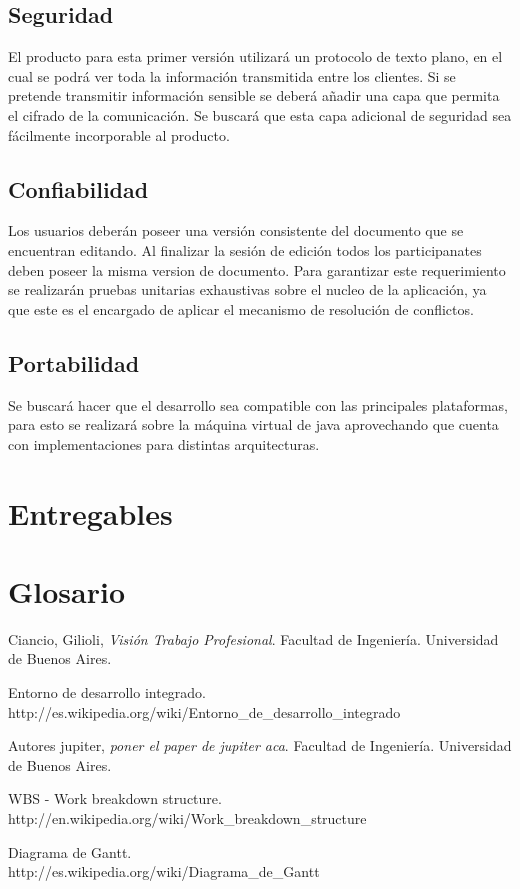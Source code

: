 \documentclass[12pt,a4paper]{article}
\begin{document}
\subsection{Seguridad} El producto para esta primer versión utilizará un protocolo de texto plano, en el cual se podrá ver toda la información transmitida entre los clientes. Si se pretende transmitir información sensible se deberá añadir una capa que permita el cifrado de la comunicación. Se buscará que esta capa adicional de seguridad sea fácilmente incorporable al producto.

\subsection{Confiabilidad} Los usuarios deberán poseer una versión consistente del documento que se encuentran editando. Al finalizar la sesión de edición todos los participanates deben poseer la misma version de documento. Para garantizar este requerimiento se realizarán pruebas unitarias exhaustivas sobre el nucleo de la aplicación, ya que este es el encargado de aplicar el mecanismo de resolución de conflictos.

\subsection{Portabilidad} Se buscará hacer que el desarrollo sea compatible con las principales plataformas, para esto se realizará sobre la máquina virtual de java aprovechando que cuenta con implementaciones para distintas arquitecturas.	
	
	\section{Entregables}
	\section{Glosario}

\newpage
\begin{thebibliography}{9}
	Ciancio, Gilioli,
	\emph{Visión Trabajo Profesional}.
	Facultad de Ingeniería.
	Universidad de Buenos Aires. 

	Entorno de desarrollo integrado. \\
	http://es.wikipedia.org/wiki/Entorno\_de\_desarrollo\_integrado

	Autores jupiter,
	\emph{poner el paper de jupiter aca}.
	Facultad de Ingeniería.
	Universidad de Buenos Aires.

	WBS - Work breakdown structure. \\
	http://en.wikipedia.org/wiki/Work\_breakdown\_structure

	Diagrama de Gantt. \\
	http://es.wikipedia.org/wiki/Diagrama\_de\_Gantt

\end{thebibliography}
\end{document}
